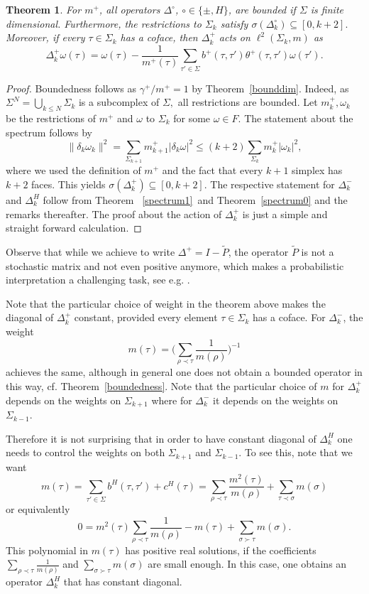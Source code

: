 \documentclass[10pt]{amsart}
\newtheorem{theorem}{Theorem}[section]
\theoremstyle{definition}
\renewcommand{\bullet}{{\circ}}
\begin{document}
\begin{theorem}For $m^{+}$, all operators $\Delta^{\bullet}$, $\bullet\in\{\pm,H\}$, are bounded if $\Sigma$ is finite dimensional. Furthermore, the restrictions to $\Sigma_{k}$ satisfy  $\sigma(\Delta^\bullet_k)\subseteq [0,k+2].$  Moreover, if every $\tau\in\Sigma_k$ has a coface, then $\Delta^+_k$ acts on $\ell^2(\Sigma_k,m)$ as $$\Delta^+_k\omega(\tau) = \omega(\tau)-\frac{1}{m^+(\tau)}\sum_{\tau'\in\Sigma}b^+(\tau,\tau')\theta^+(\tau,\tau')\omega(\tau').$$
\end{theorem}
\begin{proof}Boundedness follows as $\gamma^{+}/m^{+}=1$ by Theorem~\ref{bounddim}. Indeed, as $\Sigma^{N}=\bigcup_{k\leq N}\Sigma_{k}$ is a subcomplex of $\Sigma,$ all restrictions are bounded. Let $m^+_{k},\omega_{k}$ be the restrictions of $m^+$ and $\omega $ to $\Sigma_{k}$ for some $\omega\in F$. The statement about the spectrum follows by 
\begin{equation*}
	\|\delta_{k} \omega_k\|^{2}=\sum_{\Sigma_{k+1}}m^{+}_{k+1}|\delta_{k} \omega|^{2}\leq (k+2) \sum_{\Sigma_{k}}m^{+}_k|\omega_k|^{2},
\end{equation*}
where we used the definition of $m^{+}$ and the fact that every $k+1$ simplex has $k+2$ faces. This yields $\sigma(\Delta^+_k)\subseteq [0,k+2]. $ The respective statement for $\Delta^-_k$ and $\Delta^H_k$ follow from Theorem~ \ref{spectrum1}~and Theorem~\ref{spectrum0} and the remarks thereafter.
The proof about the action of $\Delta^+_k$ is just a simple and straight forward calculation. 
\end{proof}
Observe that while we achieve to write $\Delta^{+}=I-\tilde P$, the operator $\tilde P$ is not a stochastic matrix and not even positive anymore, which makes a probabilistic interpretation a challenging task, see e.g. \cite{Parzanchevski}.


Note that the particular choice of weight in the theorem above makes the diagonal of $\Delta^+_k$ constant, provided every element $\tau\in\Sigma_k$ has a coface. For $\Delta^-_k$, the weight
$$m(\tau) =  \Big(\sum_{\rho\prec\tau}\frac{1}{m(\rho)}\Big)^{-1}$$ achieves the same, although in general one does not obtain a bounded operator in this way, cf. Theorem~\ref{boundedness}. Note that the particular choice of $m$ for $\Delta^+_k$ depends on the weights on $\Sigma_{k+1}$ where for $\Delta^-_k$ it depends on the weights on $\Sigma_{k-1}.$ 

Therefore it is not surprising that in order to have constant diagonal of $\Delta^H_k$ one needs to control the weights on both $\Sigma_{k+1}$ and $\Sigma_{k-1}.$ To see this, note that we want 
$$m(\tau) = \sum_{\tau'\in \Sigma}b^H(\tau,\tau')+c^H(\tau) = \sum_{\rho\prec\tau}\frac{m^2(\tau)}{m(\rho)}+\sum_{\tau\prec\sigma}m(\sigma)$$ or equivalently 
$$0 = m^2(\tau)\sum_{\rho\prec\tau}\frac{1}{m(\rho)}-m(\tau)+\sum_{\sigma\succ \tau}m(\sigma).$$ This polynomial in $m(\tau)$ has positive real solutions, if the coefficients $\sum_{\rho\prec\tau}\frac{1}{m(\rho)}$ and $\sum_{\sigma\succ \tau}m(\sigma)$
are small enough. In this case, one obtains an operator $\Delta^{H}_{k}$ that has constant diagonal.






\end{document}
